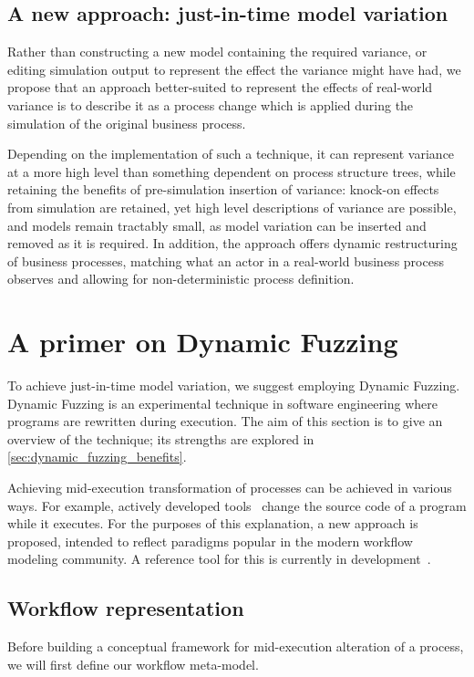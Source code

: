 \documentclass[draft,12pt]{llncs}  %
\begin{document}
\subsection{A new approach: just-in-time model variation}
Rather than constructing a new model containing the required variance, or
editing simulation output to represent the effect the variance might have had,
we propose that an approach better-suited to represent the effects of real-world
variance is to describe it as a process change which is applied
during the simulation of the original business process.
\par

Depending on the implementation of such a technique, it can represent variance
at a more high level than something dependent on process structure trees, while
retaining the benefits of pre-simulation insertion of variance: knock-on effects
from simulation are retained, yet high level descriptions of variance are
possible, and models remain tractably small, as model variation can be inserted
and removed as it is required. In addition, the approach offers dynamic
restructuring of business processes, matching what an actor in a real-world
business process observes and allowing for non-deterministic process definition.
\par

\section{A primer on Dynamic Fuzzing}
\label{sec:dynamic_fuzzing_explained}
To achieve just-in-time model variation, we suggest employing Dynamic Fuzzing.
Dynamic Fuzzing is an experimental technique in software engineering where programs are rewritten during execution. The aim of this
section is to give an overview of the technique; its strengths are explored in
\cref{sec:dynamic_fuzzing_benefits}.
\par

Achieving mid-execution transformation of processes can be achieved in various
ways. For example, actively developed tools~\citep{pdsf} change the source code
of a program while it executes. For the purposes of this explanation, a new
approach is proposed, intended to reflect paradigms popular in the modern
workflow modeling community. A reference tool for this is currently in
development~\citep{workflowgraphs}.

\subsection{Workflow representation}
Before building a conceptual framework for mid-execution alteration of a
process, we will first define our workflow meta-model.
\par
\end{document}
